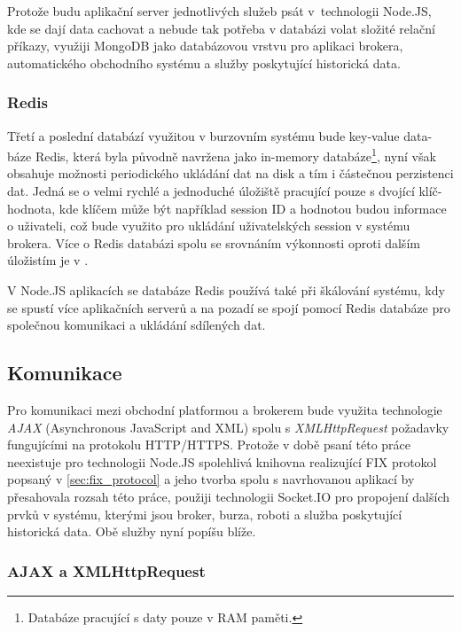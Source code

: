 \documentclass[thesis=M,czech]{FITthesis}[2012/06/26]
\begin{document}
	Protože budu aplikační server jednotlivých služeb psát v~technologii Node.JS, kde se dají data cachovat a nebude tak potřeba v databázi volat složité relační příkazy, využiji MongoDB jako databázovou vrstvu pro aplikaci brokera, automatického obchodního systému a služby poskytující historická data. 
	

\subsubsection{Redis}
	
	Třetí a poslední databází využitou v burzovním systému bude key-value data- báze Redis, která byla původně navržena jako in-memory databáze\footnote{Databáze pracující s daty pouze v RAM paměti.}, nyní však obsahuje možnosti periodického ukládání dat na disk a tím i částečnou perzistenci dat. Jedná se o velmi rychlé a jednoduché úložiště pracující pouze s dvojící klíč-hodnota, kde klíčem může být například session ID a hodnotou budou informace o uživateli, což bude využito pro ukládání uživatelských session v systému brokera. Více o Redis databázi spolu se srovnáním výkonnosti oproti dalším úložistím je v \cite{NoSQLPerformance}.
	
	V Node.JS aplikacích se databáze Redis používá také při škálování systému, kdy se spustí více aplikačních serverů a na pozadí se spojí pomocí Redis databáze pro společnou komunikaci a ukládání sdílených dat.
	
\subsection{Komunikace}

	Pro komunikaci mezi obchodní platformou a brokerem bude využita technologie \textit{AJAX} (Asynchronous JavaScript and XML) spolu s \textit{XMLHttpRequest} požadavky fungujícími na protokolu HTTP/HTTPS. Protože v době psaní této práce neexistuje pro technologii Node.JS spolehlivá knihovna realizující FIX protokol popsaný v \ref{sec:fix_protocol} a jeho tvorba spolu s navrhovanou aplikací by přesahovala rozsah této práce, použiji technologii Socket.IO  pro propojení dalších prvků v systému, kterými jsou broker, burza, roboti a služba poskytující historická data. Obě služby nyní popíšu blíže.
	
\subsubsection{AJAX a XMLHttpRequest}
	
\end{document}
